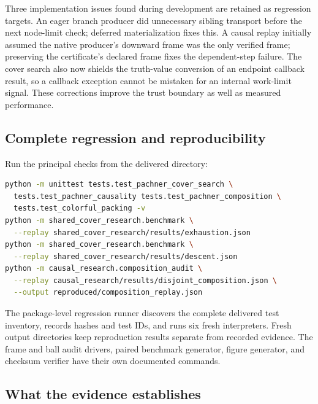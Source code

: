 Three implementation issues found during development are retained as regression
targets. An eager branch producer did unnecessary sibling transport before
the next node-limit check; deferred materialization fixes this. A causal
replay initially assumed the native producer's downward frame was the only
verified frame; preserving the certificate's declared frame fixes the
dependent-step failure. The cover search also now shields the truth-value
conversion of an endpoint callback result, so a callback exception cannot
be mistaken for an internal work-limit signal. These corrections improve the trust boundary as
well as measured performance.

\subsection{Complete regression and reproducibility}



Run the principal checks from the delivered  directory:
\begin{lstlisting}[language=bash]
python -m unittest tests.test_pachner_cover_search \
  tests.test_pachner_causality tests.test_pachner_composition \
  tests.test_colorful_packing -v
python -m shared_cover_research.benchmark \
  --replay shared_cover_research/results/exhaustion.json
python -m shared_cover_research.benchmark \
  --replay shared_cover_research/results/descent.json
python -m causal_research.composition_audit \
  --replay causal_research/results/disjoint_composition.json \
  --output reproduced/composition_replay.json
\end{lstlisting}
The package-level regression runner discovers the complete delivered test
inventory, records hashes and test IDs, and runs six fresh interpreters.
Fresh output directories keep reproduction results separate from recorded
evidence. The frame and ball audit drivers, paired benchmark generator,
figure generator, and checksum verifier have their own documented commands.

\subsection{What the evidence establishes}

